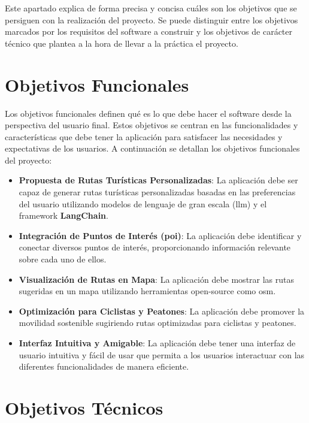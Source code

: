 
Este apartado explica de forma precisa y concisa cuáles son los objetivos que se persiguen con la realización del proyecto. Se puede distinguir entre los objetivos marcados por los requisitos del software a construir y los objetivos de carácter técnico que plantea a la hora de llevar a la práctica el proyecto.

\section{Objetivos Funcionales}

Los objetivos funcionales definen qué es lo que debe hacer el software desde la perspectiva del usuario final. Estos objetivos se centran en las funcionalidades y características que debe tener la aplicación para satisfacer las necesidades y expectativas de los usuarios. A continuación se detallan los objetivos funcionales del proyecto:

\begin{itemize}
    \item \textbf{Propuesta de Rutas Turísticas Personalizadas}: La aplicación debe ser capaz de generar rutas turísticas personalizadas basadas en las preferencias del usuario utilizando modelos de lenguaje de gran escala (\acrfull{llm}) y el framework \textbf{LangChain}.
    \item \textbf{Integración de Puntos de Interés (\acrfull{poi})}: La aplicación debe identificar y conectar diversos puntos de interés, proporcionando información relevante sobre cada uno de ellos.
    \item \textbf{Visualización de Rutas en Mapa}: La aplicación debe mostrar las rutas sugeridas en un mapa utilizando herramientas open-source como \acrfull{osm}.
    \item \textbf{Optimización para Ciclistas y Peatones}: La aplicación debe promover la movilidad sostenible sugiriendo rutas optimizadas para ciclistas y peatones.
    \item \textbf{Interfaz Intuitiva y Amigable}: La aplicación debe tener una interfaz de usuario intuitiva y fácil de usar que permita a los usuarios interactuar con las diferentes funcionalidades de manera eficiente.
\end{itemize}

\section{Objetivos Técnicos}

